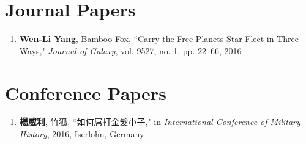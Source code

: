 \begin{publications}%


\section*{Journal Papers}
\begin{spacing}{1}
\begin{enumerate}

\item {\bf \underline{Wen-Li Yang}}, Bamboo Fox, ``Carry the Free Planets Star Fleet in Three Ways," \textit{Journal of Galaxy}, vol. 9527, no. 1, pp. 22--66, 2016

\end{enumerate}
\end{spacing}


\section*{Conference Papers}
\begin{spacing}{1}
\begin{enumerate}

\item {\bf \underline{楊威利}}, 竹狐, ``如何屌打金髮小子," in \textit{International Conference of Military History}, 2016, Iserlohn, Germany

\end{enumerate}
\end{spacing}


\end{publications}
